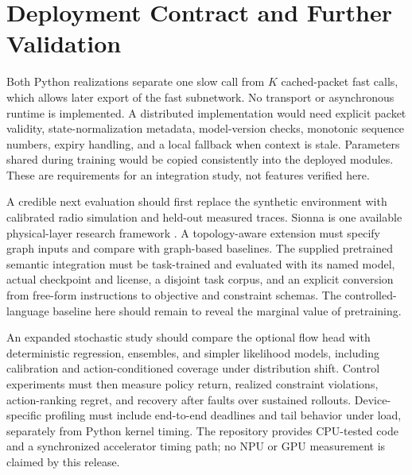 \documentclass[10pt,twocolumn]{article}
\begin{document}
\begin{table}[t]
\centering
\caption{UCC 5G real-measurement Stage-A forecast quality over a 4-second
horizon on chronologically later, session-isolated test drives. Skill is
$1-\mathrm{NMSE}_{\text{model}}/\mathrm{NMSE}_{\text{persistence}}$; positive
is better. Values are mean $\pm$ sample standard deviation over three
initialization seeds; persistence has zero variance by construction. MAE is
in physical units.}
\label{tab:ucc5g}

\end{table}

\section{Deployment Contract and Further Validation}
Both Python realizations separate one slow call from $K$ cached-packet fast calls, which
allows later export of the fast subnetwork. No transport or asynchronous runtime
is implemented. A distributed implementation would need explicit packet
validity, state-normalization metadata, model-version checks, monotonic sequence
numbers, expiry handling, and a local fallback when context is stale. Parameters
shared during training would be copied consistently into the deployed modules.
These are requirements for an integration study, not features verified here.

A credible next evaluation should first replace the synthetic environment with
calibrated radio simulation and held-out measured traces. Sionna is one available
physical-layer research framework \cite{hoydis2022}. A topology-aware extension
must specify graph inputs and compare with graph-based baselines. The supplied pretrained
semantic integration must be task-trained and evaluated with its named model,
actual checkpoint and license, a disjoint task corpus, and an explicit conversion
from free-form instructions to objective and constraint schemas. The controlled-language
baseline here should remain to reveal the marginal value of pretraining.

An expanded stochastic study should compare the optional flow head with
deterministic regression, ensembles, and simpler likelihood models, including
calibration and action-conditioned coverage under distribution shift. Control
experiments must then measure policy return, realized constraint violations,
action-ranking regret, and recovery after faults over sustained rollouts.
Device-specific profiling must include end-to-end deadlines and tail behavior
under load, separately from Python kernel timing. The repository provides
CPU-tested code and a synchronized accelerator timing path; no NPU or GPU
measurement is claimed by this release.
\end{document}

